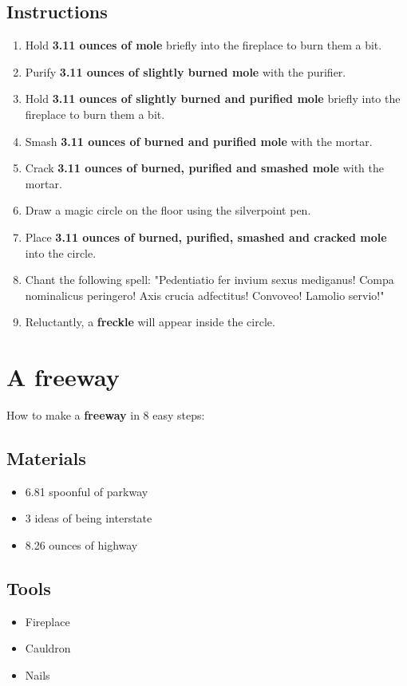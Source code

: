 \documentclass{article}
\begin{document}
\subsection{Instructions}\begin{enumerate}
\item 
Hold \textbf{3.11 ounces of mole} briefly into the fireplace to burn them a bit.
\item 
Purify \textbf{3.11 ounces of slightly burned mole} with the purifier.
\item 
Hold \textbf{3.11 ounces of slightly burned and purified mole} briefly into the fireplace to burn them a bit.
\item 
Smash \textbf{3.11 ounces of burned and purified mole} with the mortar.
\item 
Crack \textbf{3.11 ounces of burned, purified and smashed mole} with the mortar.
\item 
Draw a magic circle on the floor using the silverpoint pen.
\item 
Place \textbf{3.11 ounces of burned, purified, smashed and cracked mole} into the circle.
\item 
Chant the following spell: "Pedentiatio fer invium sexus mediganus! Compa nominalicus peringero! Axis crucia adfectitus! Convoveo! Lamolio servio!"
\item 
Reluctantly, a \textbf{freckle} will appear inside the circle.
\end{enumerate}
\newpage
\section{A freeway}How to make a \textbf{freeway} in 8 easy steps:

\subsection{Materials}\begin{itemize}
\item 
6.81 spoonful of parkway
\item 
3 ideas of being interstate
\item 
8.26 ounces of highway
\end{itemize}
\subsection{Tools}\begin{itemize}
\item 
Fireplace
\item 
Cauldron
\item 
Nails
\end{itemize}
\end{document}
